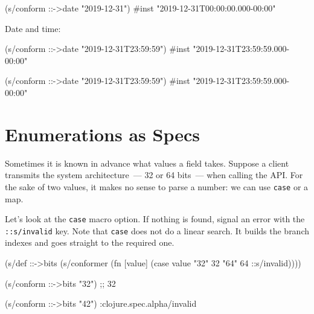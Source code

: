 \begin{english}
  \begin{clojure}
(s/conform ::->date "2019-12-31")
#inst "2019-12-31T00:00:00.000-00:00"
  \end{clojure}
\end{english}

\noindent
Date and time:

\ifx\DEVICETYPE\MOBILE

\begin{english}
  \begin{clojure}
(s/conform ::->date
           "2019-12-31T23:59:59")
#inst "2019-12-31T23:59:59.000-00:00"
  \end{clojure}
\end{english}

\else

\begin{english}
  \begin{clojure}
(s/conform ::->date "2019-12-31T23:59:59")
#inst "2019-12-31T23:59:59.000-00:00"
  \end{clojure}
\end{english}

\fi

\section{Enumerations as Specs}


Sometimes it is known in advance what values a field takes. Suppose a client transmits the system architecture~--- 32 or 64 bits~--- when calling the API. For the sake of two values, it makes no sense to parse a number: we can use \verb|case| or a map.

Let's look at the \verb|case| macro option. If nothing is found, signal an error with the \verb|::s/invalid| key. Note that \verb|case| does not do a linear search. It builds the branch indexes and goes straight to the required one.


\ifx\DEVICETYPE\MOBILE

\begin{english}
  \begin{clojure}
(s/def ::->bits
  (s/conformer
   (fn [value]
     (case value
       "32" 32 "64" 64
       ::s/invalid))))

(s/conform ::->bits "32") ;; 32

(s/conform ::->bits "42")
:clojure.spec.alpha/invalid
  \end{clojure}
\end{english}

